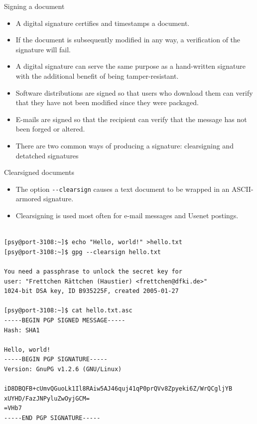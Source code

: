 \documentclass[%
mode=present,%
paper=smartboard,
size=20pt,
]{powerdot}
\newcommand{\clopt}[1]{\texttt{{-}#1}}
\begin{document}
\begin{slide}{Signing a document}
  \begin{itemize}
  \item A digital signature certifies and timestamps a document.
  \item If the document is subsequently modified in any way, a
    verification of the signature will fail.
  \item A digital signature can serve the same purpose as a
    hand-written signature with the additional benefit of being
    tamper-resistant.
  \item Software distributions are signed so that users who download
    them can verify that they have not been modified since they were
    packaged.
  \item E-mails are signed so that the recipient can verify that the
    message has not been forged or altered.
  \item There are two common ways of producing a signature:
    clearsigning and detatched signatures
  \end{itemize}
\end{slide}

\makeatletter\renewcommand{\verbatim@font}{\tiny\tt}\makeatother
\begin{slide}[method=direct]{Clearsigned documents}
  \begin{itemize}
  \item The option \clopt{-clearsign} causes a text document to be
    wrapped in an ASCII-armored signature.
  \item Clearsigning is used most often for e-mail messages and Usenet
    postings.
  \end{itemize}
\begin{verbatim}

[psy@port-3108:~]$ echo "Hello, world!" >hello.txt
[psy@port-3108:~]$ gpg --clearsign hello.txt

You need a passphrase to unlock the secret key for
user: "Frettchen Rättchen (Haustier) <frettchen@dfki.de>"
1024-bit DSA key, ID B935225F, created 2005-01-27

[psy@port-3108:~]$ cat hello.txt.asc
-----BEGIN PGP SIGNED MESSAGE-----
Hash: SHA1

Hello, world!
-----BEGIN PGP SIGNATURE-----
Version: GnuPG v1.2.6 (GNU/Linux)

iD8DBQFB+cUmvQGuoLk1Il8RAiw5AJ46quj41qP0prQVv8Zpyeki6Z/WrQCgljYB
xUYHD/FazJNPyluZwOyjGCM=
=VHb7
-----END PGP SIGNATURE-----
\end{verbatim}%
\end{slide}
\end{document}
